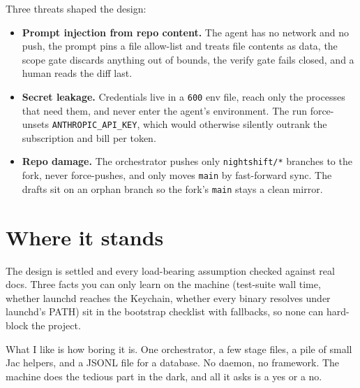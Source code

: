 \documentclass[11pt]{article}
\newcommand{\code}[1]{{\color{night}\texttt{#1}}}
\begin{document}
Three threats shaped the design:

\begin{itemize}
  \item \textbf{Prompt injection from repo content.} The agent has no network and
    no push, the prompt pins a file allow-list and treats file contents as data,
    the scope gate discards anything out of bounds, the verify gate fails closed,
    and a human reads the diff last.
  \item \textbf{Secret leakage.} Credentials live in a \code{600} env file, reach
    only the processes that need them, and never enter the agent's environment. The
    run force-unsets \code{ANTHROPIC\_API\_KEY}, which would otherwise silently
    outrank the subscription and bill per token.
  \item \textbf{Repo damage.} The orchestrator pushes only \code{nightshift/*}
    branches to the fork, never force-pushes, and only moves \code{main} by
    fast-forward sync. The drafts sit on an orphan branch so the fork's
    \code{main} stays a clean mirror.
\end{itemize}

\section*{Where it stands}

The design is settled and every load-bearing assumption checked against real docs.
Three facts you can only learn on the machine (test-suite wall time, whether
launchd reaches the Keychain, whether every binary resolves under launchd's PATH)
sit in the bootstrap checklist with fallbacks, so none can hard-block the project.

What I like is how boring it is. One orchestrator, a few stage files, a pile of
small Jac helpers, and a JSONL file for a database. No daemon, no framework. The
machine does the tedious part in the dark, and all it asks is a yes or a no.
\end{document}

